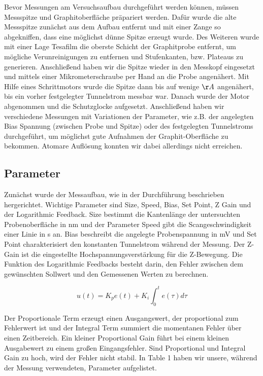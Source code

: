 \documentclass[10pt,a4paper]{article}
\begin{document}
Bevor Messungen am Versuchsaufbau durchgeführt werden können, müssen Messspitze und Graphitoberfläche präpariert werden. Dafür wurde die alte Messspitze zunächst aus dem Aufbau entfernt und mit einer Zange so abgekniffen, dass eine möglichst dünne Spitze erzeugt wurde. Des Weiteren wurde mit einer Lage Tesafilm die oberste Schicht der Graphitprobe entfernt, um mögliche Verunreinigungen zu entfernen und Stufenkanten, bzw. Plateaus zu generieren. Anschließend haben wir die Spitze wieder in den Messkopf eingesetzt und mittels einer Mikrometerschraube per Hand an die Probe angenähert. Mit Hilfe eines Schrittmotors wurde die Spitze dann bis auf wenige $\AA$ angenähert, bis ein vorher festgelegter Tunnelstrom messbar war. Danach wurde der Motor abgenommen und die Schutzglocke aufgesetzt. Anschließend haben wir verschiedene Messungen mit Variationen der Parameter, wie z.B. der angelegten Bias Spannung (zwischen Probe und Spitze) oder des festgelegten Tunnelstroms durchgeführt, um möglichst gute Aufnahmen der Graphit-Oberfläche zu bekommen. Atomare Auflösung konnten wir dabei allerdings nicht erreichen.

\subsection{Parameter}

Zunächst wurde der Messaufbau, wie in der Durchführung beschrieben hergerichtet. Wichtige Parameter sind Size, Speed, Bias, Set Point, Z Gain und der Logarithmic Feedback. Size bestimmt die Kantenlänge der untersuchten Probenoberfläche in nm und der Parameter Speed gibt die Scangeschwindigkeit einer Linie in s an. Bias beschreibt die angelegte Probenspannung in mV und Set Point charakterisiert den konstanten Tunnelstrom während der Messung. Der Z-Gain ist die eingestellte Hochspannungsverstärkung für die Z-Bewegung. Die Funktion des Logarithmic Feedbacks besteht darin, den Fehler zwischen dem gewünschten Sollwert und den Gemessenen Werten zu berechnen. 

$$u(t) = K_{p}e(t)+K_{i}  \int_{0}^{t}e(\tau)d\tau$$

Der Proportionale Term erzeugt einen Ausgangswert, der proportional zum Fehlerwert ist und der Integral Term summiert die momentanen Fehler über einen Zeitbereich. Ein kleiner Proportional Gain führt bei einem kleinen Ausgabewert zu einem großen Eingangsfehler.  Sind Proportional und Integral Gain zu hoch, wird der Fehler nicht stabil. In Table 1 haben wir unsere, während der Messung verwendeten, Parameter aufgelistet.
\end{document}
